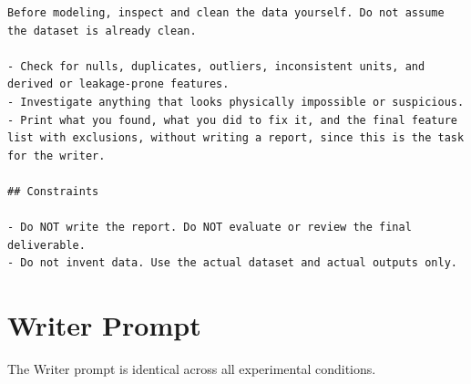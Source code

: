 \begin{lstlisting}[basicstyle=\small\ttfamily, breaklines=true, frame=single, caption={Coder system prompt (\texttt{coder.md})}]
Before modeling, inspect and clean the data yourself. Do not assume the dataset is already clean.

- Check for nulls, duplicates, outliers, inconsistent units, and derived or leakage-prone features.
- Investigate anything that looks physically impossible or suspicious.
- Print what you found, what you did to fix it, and the final feature list with exclusions, without writing a report, since this is the task for the writer.

## Constraints

- Do NOT write the report. Do NOT evaluate or review the final deliverable.
- Do not invent data. Use the actual dataset and actual outputs only.
\end{lstlisting}

\section{Writer Prompt}
\label{app:writer-prompt}

The Writer prompt is identical across all experimental conditions.


